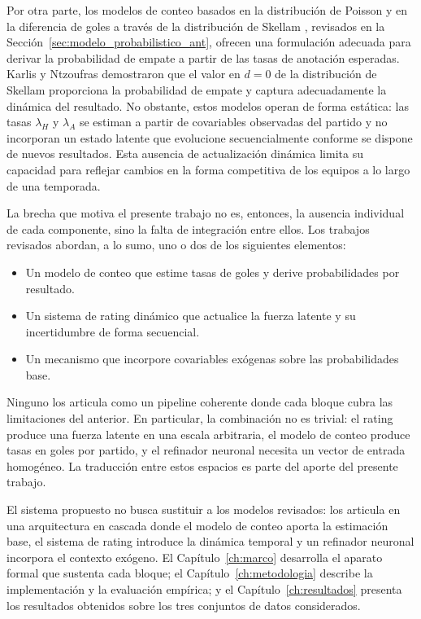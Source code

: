 Por otra parte, los modelos de conteo basados en la distribuci\'on de Poisson \cite{maher1982} y en la diferencia de goles a trav\'es de la distribuci\'on de Skellam \cite{skellam1946,karlis2003}, revisados en la Secci\'on~\ref{sec:modelo_probabilistico_ant}, ofrecen una formulaci\'on adecuada para derivar la probabilidad de empate a partir de las tasas de anotaci\'on esperadas. Karlis y Ntzoufras \cite{karlis2003} demostraron que el valor en $d=0$ de la distribuci\'on de Skellam proporciona la probabilidad de empate y captura adecuadamente la din\'amica del resultado. No obstante, estos modelos operan de forma est\'atica: las tasas $\lambda_H$ y 
$\lambda_A$ se estiman a partir de covariables observadas del partido y no incorporan un estado latente que evolucione secuencialmente conforme se dispone de nuevos resultados. Esta 
ausencia de actualizaci\'on din\'amica limita su capacidad para reflejar cambios en la forma competitiva de los equipos a lo largo de una temporada.

La brecha que motiva el presente trabajo no es, entonces, la ausencia individual de cada componente, sino la falta de integraci\'on entre ellos. Los trabajos revisados abordan, a lo sumo, uno o dos de los siguientes elementos:

\begin{itemize}
	\item Un modelo de conteo que estime tasas de goles y derive probabilidades por resultado.
	\item Un sistema de rating din\'amico que actualice la fuerza latente y su incertidumbre de forma secuencial.
	\item Un mecanismo que incorpore covariables ex\'ogenas sobre las probabilidades base.
\end{itemize}

Ninguno los articula como un pipeline coherente donde cada bloque cubra las limitaciones del anterior. En particular, la 
combinaci\'on no es trivial: el rating produce una fuerza latente en una escala arbitraria, el modelo de conteo produce tasas en goles por partido, y el refinador neuronal necesita un vector de entrada homog\'eneo. La traducci\'on entre estos espacios es parte del aporte del presente trabajo.

El sistema propuesto no busca sustituir a los modelos revisados: los articula en una arquitectura en cascada donde el modelo de 
conteo aporta la estimaci\'on base, el sistema de rating introduce la din\'amica temporal y un refinador neuronal incorpora el contexto ex\'ogeno. El Cap\'itulo~\ref{ch:marco} desarrolla el aparato formal que sustenta cada bloque; el Cap\'itulo~\ref{ch:metodologia} describe la implementaci\'on y la evaluaci\'on emp\'irica; y el Cap\'itulo~\ref{ch:resultados} 
presenta los resultados obtenidos sobre los tres conjuntos de datos considerados.